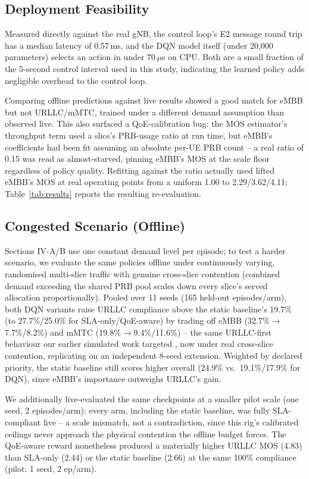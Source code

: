 \documentclass[conference]{IEEEtran}
\begin{document}
\subsection{Deployment Feasibility}
\label{sec:feasibility}
Measured directly against the real gNB, the control loop's E2
message round trip has a median latency of 0.57\,ms, and the DQN
model itself (under 20,000 parameters) selects an action in under
70\,$\mu$s on CPU. Both are a small fraction of the 5-second control
interval used in this study, indicating the learned policy adds
negligible overhead to the control loop.

Comparing offline predictions against live results showed a good
match for eMBB but not URLLC/mMTC, trained under a different demand
assumption than observed live. This also surfaced a QoE-calibration
bug: the MOS estimator's throughput term used a slice's PRB-usage
ratio at run time, but eMBB's coefficients had been fit assuming an
absolute per-UE PRB count -- a real ratio of 0.15 was read as
almost-starved, pinning eMBB's MOS at the scale floor regardless of
policy quality. Refitting against the ratio actually used lifted
eMBB's MOS at real operating points from a uniform 1.00 to
2.29/3.62/4.11; Table~\ref{tab:results} reports the resulting
re-evaluation.

\subsection{Congested Scenario (Offline)}
Sections IV-A/B use one constant demand level per episode; to test a
harder scenario, we evaluate the same policies offline under
continuously varying, randomised multi-slice traffic with genuine
cross-slice contention (combined demand exceeding the shared PRB pool
scales down every slice's served allocation proportionally). Pooled
over 11 seeds (165 held-out episodes/arm), both DQN variants raise
URLLC compliance above the static baseline's 19.7\% (to 27.7\%/25.0\%
for SLA-only/QoE-aware) by trading off eMBB (32.7\%$\to$7.7\%/8.2\%)
and mMTC (19.8\%$\to$9.4\%/11.6\%) -- the same URLLC-first behaviour
our earlier simulated work targeted \cite{mecon-paper1,icraie-paper2},
now under real cross-slice contention, replicating on an independent
8-seed extension. Weighted by declared priority, the static baseline
still scores higher overall (24.9\% vs.\ 19.1\%/17.9\% for DQN), since
eMBB's importance outweighs URLLC's gain.

We additionally live-evaluated the same checkpoints at a smaller
pilot scale (one seed, 2 episodes/arm): every arm, including the
static baseline, was fully SLA-compliant live -- a scale mismatch,
not a contradiction, since this rig's calibrated ceilings never
approach the physical contention the offline budget forces. The
QoE-aware reward nonetheless produced a materially higher URLLC MOS
(4.83) than SLA-only (2.44) or the static baseline (2.66) at the same
100\% compliance (pilot: 1 seed, 2 ep/arm).
\end{document}
